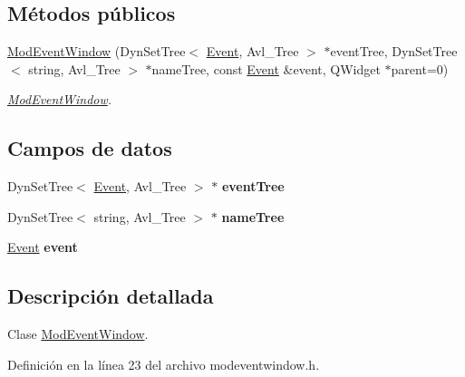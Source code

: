 \subsection*{Métodos públicos}
\begin{DoxyCompactItemize}
\item 
\hyperlink{class_mod_event_window_abc294bd872d219a6d6f7993b124b94ef}{Mod\+Event\+Window} (Dyn\+Set\+Tree$<$ \hyperlink{class_event}{Event}, Avl\+\_\+\+Tree $>$ $\ast$event\+Tree, Dyn\+Set\+Tree$<$ string, Avl\+\_\+\+Tree $>$ $\ast$name\+Tree, const \hyperlink{class_event}{Event} \&event, Q\+Widget $\ast$parent=0)
\begin{DoxyCompactList}\small\item\em \hyperlink{class_mod_event_window}{Mod\+Event\+Window}. \end{DoxyCompactList}\end{DoxyCompactItemize}
\subsection*{Campos de datos}
\begin{DoxyCompactItemize}
\item 
Dyn\+Set\+Tree$<$ \hyperlink{class_event}{Event}, Avl\+\_\+\+Tree $>$ $\ast$ {\bfseries event\+Tree}\hypertarget{class_mod_event_window_afe17e39631e29b25a5442bfa41575dce}{}\label{class_mod_event_window_afe17e39631e29b25a5442bfa41575dce}

\item 
Dyn\+Set\+Tree$<$ string, Avl\+\_\+\+Tree $>$ $\ast$ {\bfseries name\+Tree}\hypertarget{class_mod_event_window_a0e3b2af740cdb1b206b0ff92a17247f2}{}\label{class_mod_event_window_a0e3b2af740cdb1b206b0ff92a17247f2}

\item 
\hyperlink{class_event}{Event} {\bfseries event}\hypertarget{class_mod_event_window_aa6931186e1f39dafc51befc85bed2470}{}\label{class_mod_event_window_aa6931186e1f39dafc51befc85bed2470}

\end{DoxyCompactItemize}


\subsection{Descripción detallada}
Clase \hyperlink{class_mod_event_window}{Mod\+Event\+Window}. 

Definición en la línea 23 del archivo modeventwindow.\+h.



